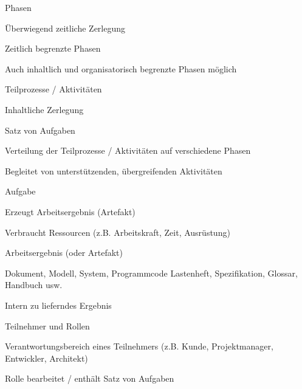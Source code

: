 \documentclass[a4paper]{article}
\begin{document}
\begin{multicols}{3}
  Phasen
  \begin{itemize*}
    \item Überwiegend zeitliche Zerlegung
    \item Zeitlich begrenzte Phasen
    \item Auch inhaltlich und organisatorisch begrenzte Phasen möglich
    \item Teilprozesse / Aktivitäten
    \begin{itemize*}
      \item Inhaltliche Zerlegung
      \item Satz von Aufgaben
      \item Verteilung der Teilprozesse / Aktivitäten auf verschiedene Phasen
      \item Begleitet von unterstützenden, übergreifenden Aktivitäten
    \end{itemize*}
  \end{itemize*}

  Aufgabe
  \begin{itemize*}
    \item Erzeugt Arbeitsergebnis (Artefakt)
    \item Verbraucht Ressourcen (z.B. Arbeitskraft, Zeit, Ausrüstung)
  \end{itemize*}

  Arbeitsergebnis (oder Artefakt)
  \begin{itemize*}
    \item Dokument, Modell, System, Programmcode Lastenheft, Spezifikation, Glossar, Handbuch usw.
    \item Intern zu lieferndes Ergebnis
  \end{itemize*}

  Teilnehmer und Rollen
  \begin{itemize*}
    \item Verantwortungsbereich eines Teilnehmers (z.B. Kunde, Projektmanager, Entwickler, Architekt)
    \item Rolle bearbeitet / enthält Satz von Aufgaben
  \end{itemize*}


\end{multicols}
\end{document}
